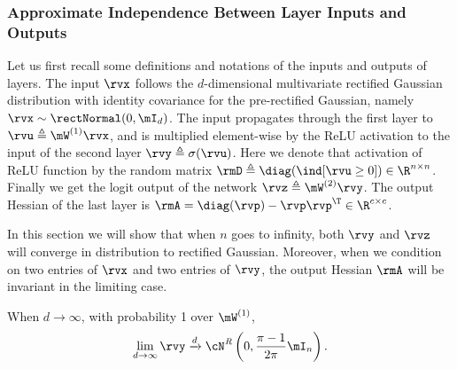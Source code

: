 \subsubsection{Approximate Independence Between Layer Inputs and Outputs}
Let us first recall some definitions and notations of the inputs and outputs of layers. The input $\rvx$ follows the $d$-dimensional multivariate rectified Gaussian distribution with identity covariance for the pre-rectified Gaussian, namely $\rvx\sim\rectNormal(0, \mI_d)$. The input propagates through the first layer to $\rvu\triangleq\mW^{(1)}\rvx$, and is multiplied element-wise by the ReLU activation to the input of the second layer $\rvy\triangleq \sigma(\rvu)$. Here we denote that activation of ReLU function by the random matrix $\rmD\triangleq \diag(\ind[\rvu\geq 0])\in\R^{n\times n}$. Finally we get the logit output of the network $\rvz\triangleq \mW^{(2)}\rvy$. The output Hessian of the last layer is $\rmA=\diag(\rvp)-\rvp\rvp^\T\in\R^{c\times c}$.

In this section we will show that when $n$ goes to infinity, both $\rvy$ and $\rvz$ will converge in distribution to rectified Gaussian. Moreover, when we condition on two entries of $\rvx$ and two entries of $\rvy$, the output Hessian $\rmA$ will be invariant in the limiting case.

\begin{lemma}
\label{lemma:y-gaussian}
When $d\to \infty$, with probability 1 over $\mW^{(1)}$,
\begin{equation*}
    \lim_{d\to\infty}\rvy\xrightarrow{d}\cN^{\emph{R}}\left(0,\frac{\pi-1}{2\pi}\mI_n\right).
\end{equation*}
\end{lemma}

